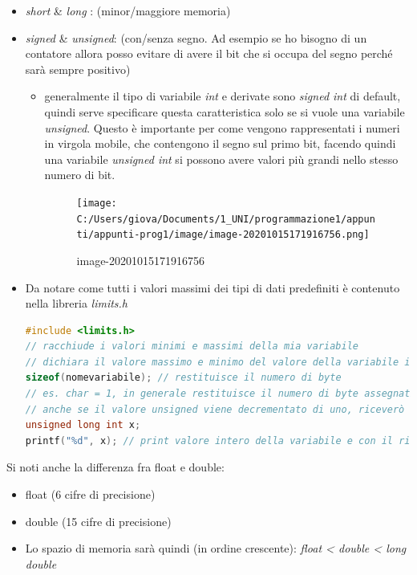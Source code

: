 \documentclass[
  paper=a4,
  oneside  ,captions=tableheading
]{scrbook}
\providecommand{\tightlist}{%
  \setlength{\itemsep}{0pt}\setlength{\parskip}{0pt}}
\begin{document}
\begin{itemize}
\item
  \emph{short} \& \emph{long} : (minor/maggiore memoria)
\item
  \emph{signed} \& \emph{unsigned}: (con/senza segno. Ad esempio se ho
  bisogno di un contatore allora posso evitare di avere il bit che si
  occupa del segno perché sarà sempre positivo)

  \begin{itemize}
  \item
    generalmente il tipo di variabile \emph{int} e derivate sono
    \emph{signed int} di default, quindi serve specificare questa
    caratteristica solo se si vuole una variabile \emph{unsigned}.
    Questo è importante per come vengono rappresentati i numeri in
    virgola mobile, che contengono il segno sul primo bit, facendo
    quindi una variabile \emph{unsigned int} si possono avere valori più
    grandi nello stesso numero di bit.

    \begin{figure}
    \centering
    \texttt{[image: C:/Users/giova/Documents/1\_UNI/programmazione1/appunti/appunti-prog1/image/image-20201015171916756.png]}
    \caption{image-20201015171916756}
    \end{figure}
  \end{itemize}
\item
  Da notare come tutti i valori massimi dei tipi di dati predefiniti è
  contenuto nella libreria \emph{limits.h}

\begin{lstlisting}[language=C]
#include <limits.h>
// racchiude i valori minimi e massimi della mia variabile
// dichiara il valore massimo e minimo del valore della variabile in una certa architettura
sizeof(nomevariabile); // restituisce il numero di byte
// es. char = 1, in generale restituisce il numero di byte assegnati a una variabile passata al costrutto.
// anche se il valore unsigned viene decrementato di uno, riceverò un valore positivo, nonstante fosse stato inizializzato a zero.
unsigned long int x;
printf("%d", x); // print valore intero della variabile e con il rispettivo sengno, anche se dichiarata unsigned. QUesto avviene perchè converte il valore da long a int.
\end{lstlisting}
\end{itemize}

Si noti anche la differenza fra float e double:

\begin{itemize}
\tightlist
\item
  float (6 cifre di precisione)
\item
  double (15 cifre di precisione)
\item
  Lo spazio di memoria sarà quindi (in ordine crescente): \emph{float
  \textless{} double \textless{} long double}
\end{itemize}
\end{document}
